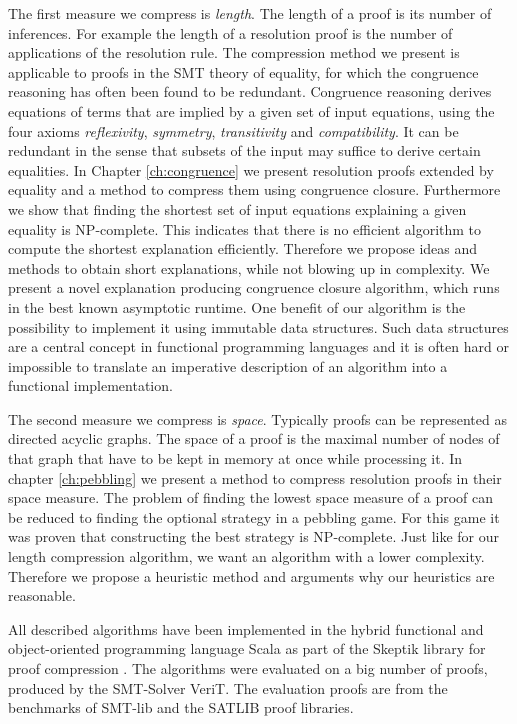 The first measure we compress is \emph{length}.
The length of a proof is its number of inferences.
For example the length of a resolution proof is the number of applications of the resolution rule.
The compression method we present is applicable to proofs in the SMT theory of equality, for which the congruence reasoning has often been found to be redundant.
Congruence reasoning derives equations of terms that are implied by a given set of input equations, 
using the four axioms \emph{reflexivity}, \emph{symmetry}, \emph{transitivity} and \emph{compatibility}. 
It can be redundant in the sense that subsets of the input may suffice to derive certain equalities.
In Chapter \ref{ch:congruence} we present resolution proofs extended by equality and a method to compress them using congruence closure.
Furthermore we show that finding the shortest set of input equations explaining a given equality is NP-complete.
This indicates that there is no efficient algorithm to compute the shortest explanation efficiently.
Therefore we propose ideas and methods to obtain short explanations, while not blowing up in complexity.
We present a novel explanation producing congruence closure algorithm, which runs in the best known asymptotic runtime.
One benefit of our algorithm is the possibility to implement it using immutable data structures.
Such data structures are a central concept in functional programming languages and it is often hard or impossible to translate an imperative description of an algorithm into a functional implementation.

The second measure we compress is \emph{space}.
Typically proofs can be represented as directed acyclic graphs.
The space of a proof is the maximal number of nodes of that graph that have to be kept in memory at once while processing it.
In chapter \ref{ch:pebbling} we present a method to compress resolution proofs in their space measure.
The problem of finding the lowest space measure of a proof can be reduced to finding the optional strategy in a pebbling game.
For this game it was proven that constructing the best strategy is NP-complete.
Just like for our length compression algorithm, we want an algorithm with a lower complexity.
Therefore we propose a heuristic method and arguments why our heuristics are reasonable.

All described algorithms have been implemented in the hybrid functional and object-oriented programming
language Scala as part of the Skeptik library for proof compression \cite{Boudou2014}.
The algorithms were evaluated on a big number of proofs, produced by the SMT-Solver VeriT.
The evaluation proofs are from the benchmarks of SMT-lib and the SATLIB proof libraries.

